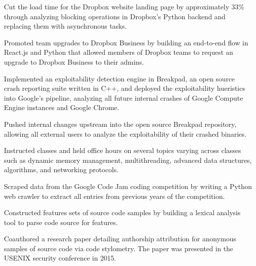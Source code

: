 \documentclass[]{template}
\begin{document}
\begin{tightemize}
\item Cut the load time for the Dropbox website landing page by approximately 33\% through analyzing blocking operations in Dropbox's Python backend and replacing them with asynchronous tasks.
\item Promoted team upgrades to Dropbox Business by building an end-to-end flow in React.js and Python that allowed members of Dropbox teams to request an upgrade to Dropbox Business to their admins.
\end{tightemize}
\sectionsep

\begin{tightemize}
\item Implemented an exploitability detection engine in Breakpad, an open source crash reporting suite written in C++, and deployed the exploitability hueristics into Google's pipeline, analyzing all future internal crashes of Google Compute Engine instances and Google Chrome.
\item Pushed internal changes upstream into the open source Breakpad repository, allowing all external users to analyze the exploitability of their crashed binaries.
\end{tightemize}
\sectionsep

\begin{tightemize}
\item Instructed classes and held office hours on several topics varying across classes such as dynamic memory management, multithreading, advanced data structures, algorithms, and networking protocols.
\end{tightemize}
\sectionsep

\begin{tightemize}
\item Scraped data from the Google Code Jam coding competition by writing a Python web crawler to extract all entries from previous years of the competition.
\item Constructed features sets of source code samples by building a lexical analysis tool to parse code source for features.
\item Coauthored a research paper detailing authorship attribution for anonymous samples of source code via code stylometry. The paper was presented in the USENIX security conference in 2015.
\end{tightemize}
\sectionsep
\end{document}
